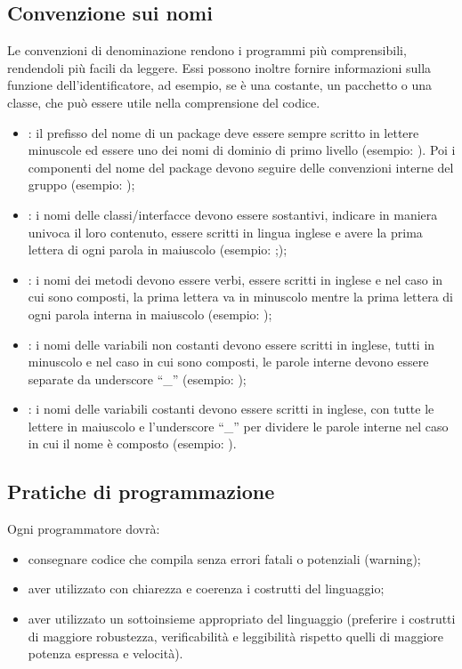 \subsection{Convenzione sui nomi}
Le convenzioni di denominazione rendono i programmi pi\`u comprensibili,
rendendoli pi\`u facili da leggere. Essi possono inoltre fornire informazioni
sulla funzione dell'identificatore, ad esempio, se \`e una costante, un
pacchetto o una classe, che pu\`o essere utile nella comprensione del codice.
\begin{itemize}
  \item {}: il prefisso del nome di un package deve essere sempre
  scritto in lettere minuscole ed essere uno dei nomi di dominio di primo
  livello (esempio: ).
  Poi i componenti del nome del package devono seguire delle
  convenzioni interne del gruppo (esempio: );
  \item {}: i nomi delle classi/interfacce devono essere
  sostantivi, indicare in maniera univoca il loro contenuto, essere scritti in
  lingua inglese e avere la prima lettera di ogni parola in maiuscolo (esempio:
  ;);
  \item {}: i nomi dei metodi devono essere verbi, essere scritti in
  inglese e nel caso in cui sono composti, la prima lettera va in
  minuscolo mentre la prima lettera di ogni parola interna in maiuscolo
  (esempio: );
  \item {}: i nomi delle variabili non costanti devono essere scritti in
  inglese, tutti in minuscolo e nel caso in cui sono composti, le parole interne
  devono essere separate da underscore ``\_'' (esempio: );
  \item {}: i nomi delle variabili costanti devono essere
  scritti in inglese, con tutte le lettere in maiuscolo e l'underscore ``\_''
  per dividere le parole interne nel caso in cui il nome \`e composto (esempio:
  ).
\end{itemize}

\subsection{Pratiche di programmazione}
Ogni programmatore dovr\`a:
\begin{itemize}
  \item{consegnare codice che compila senza errori fatali o
potenziali (warning);} 
  \item{aver utilizzato con chiarezza e coerenza i costrutti del
linguaggio;}
  \item{aver utilizzato un sottoinsieme appropriato del linguaggio
(preferire i costrutti di maggiore robustezza, verificabilit\`a e leggibilit\`a
rispetto quelli di maggiore potenza espressa e velocit\`a).}
\end{itemize}

